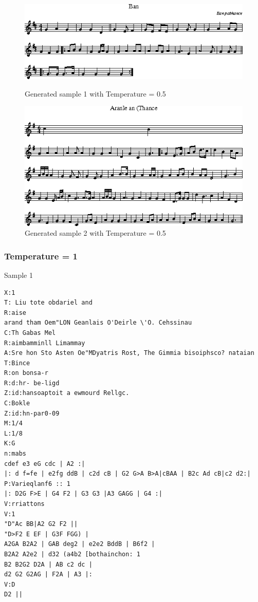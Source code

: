 \documentclass{article}
\begin{document}
\begin{figure}[h]
\begin{minipage}{0.48\textwidth}
\centering
\includegraphics[width=\textwidth]{pics/generated_music_t05_1.png}
\caption{Generated sample 1 with Temperature = 0.5}
\end{minipage}\hfill
\begin{minipage}{0.48\textwidth}
\centering
\includegraphics[width=\textwidth]{pics/generated_music_t05_2.png}
\caption{Generated sample 2 with Temperature = 0.5}
\end{minipage}
\end{figure}
\newpage
\subsubsection{Temperature = 1}
Sample 1
\begin{lstlisting}
X:1
T: Liu tote obdariel and
R:aise
arand tham Oem"LON Geanlais O'Deirle \'O. Cehssinau
C:Th Gabas Mel
R:aimbamminll Limammay
A:Sre hon Sto Asten Oe"MDyatris Rost, The Gimmia bisoiphsco? nataian
T:Bince
R:on bonsa-r
R:d:hr- be-ligd
Z:id:hansoaptoit a ewmourd Rellgc.
C:Bokle
Z:id:hn-par0-09
M:1/4
L:1/8
K:G
n:mabs
cdef e3 eG cdc | A2 :|
|: d f=fe | e2fg ddB | c2d cB | G2 G>A B>A|cBAA | B2c Ad cB|c2 d2:|
P:Varieqlanf6 :: 1
|: D2G F>E | G4 F2 | G3 G3 |A3 GAGG | G4 :|
V:rriattons
V:1
"D"Ac BB|A2 G2 F2 ||
"D>F2 E EF | G3F FGG) |
A2GA B2A2 | GAB deg2 | e2e2 BddB | B6f2 |
B2A2 A2e2 | d32 (a4b2 [bothainchon: 1
B2 B2G2 D2A | AB c2 dc | 
d2 G2 G2AG | F2A | A3 |:
V:D
D2 ||
\end{lstlisting}
\end{document}
